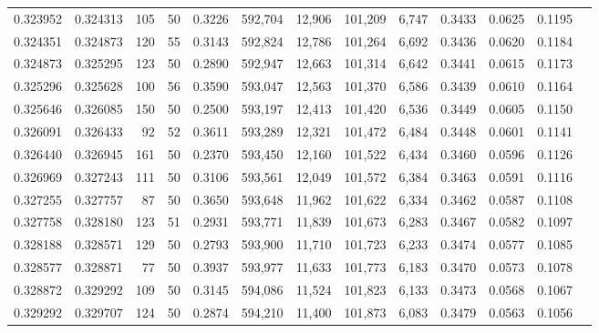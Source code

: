 \begin{tabular}{rrrrrrrrrrrrr}
0.323952 & 0.324313 &   105 &  50 &                                     0.3226 & 592,704 &  12,906 & 101,209 &   6,747 & 0.3433 & 0.0625 & 0.1195 \\
0.324351 & 0.324873 &   120 &  55 &                                     0.3143 & 592,824 &  12,786 & 101,264 &   6,692 & 0.3436 & 0.0620 & 0.1184 \\
0.324873 & 0.325295 &   123 &  50 &                                     0.2890 & 592,947 &  12,663 & 101,314 &   6,642 & 0.3441 & 0.0615 & 0.1173 \\
0.325296 & 0.325628 &   100 &  56 &                                     0.3590 & 593,047 &  12,563 & 101,370 &   6,586 & 0.3439 & 0.0610 & 0.1164 \\
0.325646 & 0.326085 &   150 &  50 &                                     0.2500 & 593,197 &  12,413 & 101,420 &   6,536 & 0.3449 & 0.0605 & 0.1150 \\
0.326091 & 0.326433 &    92 &  52 &                                     0.3611 & 593,289 &  12,321 & 101,472 &   6,484 & 0.3448 & 0.0601 & 0.1141 \\
0.326440 & 0.326945 &   161 &  50 &                                     0.2370 & 593,450 &  12,160 & 101,522 &   6,434 & 0.3460 & 0.0596 & 0.1126 \\
0.326969 & 0.327243 &   111 &  50 &                                     0.3106 & 593,561 &  12,049 & 101,572 &   6,384 & 0.3463 & 0.0591 & 0.1116 \\
0.327255 & 0.327757 &    87 &  50 &                                     0.3650 & 593,648 &  11,962 & 101,622 &   6,334 & 0.3462 & 0.0587 & 0.1108 \\
0.327758 & 0.328180 &   123 &  51 &                                     0.2931 & 593,771 &  11,839 & 101,673 &   6,283 & 0.3467 & 0.0582 & 0.1097 \\
0.328188 & 0.328571 &   129 &  50 &                                     0.2793 & 593,900 &  11,710 & 101,723 &   6,233 & 0.3474 & 0.0577 & 0.1085 \\
0.328577 & 0.328871 &    77 &  50 &                                     0.3937 & 593,977 &  11,633 & 101,773 &   6,183 & 0.3470 & 0.0573 & 0.1078 \\
0.328872 & 0.329292 &   109 &  50 &                                     0.3145 & 594,086 &  11,524 & 101,823 &   6,133 & 0.3473 & 0.0568 & 0.1067 \\
0.329292 & 0.329707 &   124 &  50 &                                     0.2874 & 594,210 &  11,400 & 101,873 &   6,083 & 0.3479 & 0.0563 & 0.1056 \\

\end{tabular}

